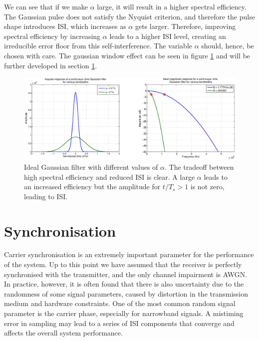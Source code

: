 \documentclass[12pt,a4paper,openright]{report}
\begin{document}
We can see that if we make $\alpha$ large, it will result in a higher spectral efficiency. The Gaussian pulse does not satisfy the Nyquist criterion, and therefore the pulse shape introduces ISI, which increases as $\alpha$ gets larger. Therefore, improving spectral efficiency by increasing $\alpha$ leads to a higher ISI level, creating an irreducible error floor from this self-interference. The variable $\alpha$ should, hence, be chosen with care. The gaussian window effect can be seen in figure \ref{fig:gaussianalpha} and will be further developed in section \ref{sec:ts}.

 \begin{figure}[H]
  \centering
    \includegraphics[width=1\textwidth]{gausswinalpha.eps}
    \caption[Ideal Gaussian filter with different values of $\alpha$]{Ideal Gaussian filter with different values of $\alpha$. The tradeoff between high spectral efficiency and reduced ISI is clear. A large $\alpha$ leads to an increased efficiency but the amplitude for $t/T_s > 1$ is not zero, leading to ISI.}
    \label{fig:gaussianalpha}
\end{figure}  

\section{Synchronisation}
\label{sec:ts}

Carrier synchronisation is an extremely important parameter for the performance of the system. Up to this point we have assumed that the receiver is perfectly synchronised with the transmitter, and the only channel impairment is AWGN. In practice, however, it is often found that there is also uncertainty due to the randomness of some signal parameters, caused by distortion in the transmission medium and hardware constraints. One of the most common random signal parameter is the carrier phase, especially for narrowband signals. A mistiming error in sampling may lead to a series of ISI components that converge and affects the overall system performance. 
\end{document}

